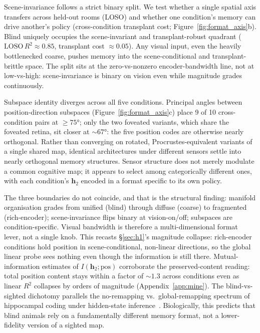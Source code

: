 \documentclass{article}
\begin{document}
Scene-invariance follows a strict binary split. We test whether a single spatial axis transfers across held-out rooms (LOSO) and whether one condition's memory can drive another's policy (cross-condition transplant cost; Figure~\ref{fig:format_axis}b). Blind uniquely occupies the scene-invariant and transplant-robust quadrant ($\text{LOSO}\,R^2 \approx 0.85$, transplant cost $\approx 0.05$). Any visual input, even the heavily bottlenecked coarse, pushes memory into the scene-conditional and transplant-brittle space. The split sits at the zero-vs-nonzero encoder-bandwidth line, not at low-vs-high: scene-invariance is binary on vision even while magnitude grades continuously.

Subspace identity diverges across all five conditions. Principal angles between position-direction subspaces (Figure~\ref{fig:format_axis}c) place 9 of 10 cross-condition pairs at $\geq 75°$; only the two foveated variants, which share the foveated retina, sit closer at $\sim 67°$: the five position codes are otherwise nearly orthogonal. Rather than converging on rotated, Procrustes-equivalent variants of a single shared map, identical architectures under different sensors settle into nearly orthogonal memory structures. Sensor structure does not merely modulate a common cognitive map; it appears to select among categorically different ones, with each condition's $\mathbf{h}_2$ encoded in a format specific to its own policy.

The three boundaries do not coincide, and that is the structural finding: manifold organisation grades from unified (blind) through diffuse (coarse) to fragmented (rich-encoder); scene-invariance flips binary at vision-on/off; subspaces are condition-specific. Visual bandwidth is therefore a multi-dimensional format lever, not a single knob. This recasts §\ref{sec:h1}'s magnitude collapse: rich-encoder conditions hold position in scene-conditional, non-linear directions, so the global linear probe sees nothing even though the information is still there. Mutual-information estimates of $I(\mathbf{h}_2; \mathrm{pos})$ corroborate the preserved-content reading: total position content stays within a factor of ${\sim}1.3$ across conditions even as linear $R^2$ collapses by orders of magnitude (Appendix~\ref{app:mine}). The blind-vs-sighted dichotomy parallels the no-remapping vs.\ global-remapping spectrum of hippocampal coding under hidden-state inference~\citep{sanders2020remapping}. Biologically, this predicts that blind animals rely on a fundamentally different memory format, not a lower-fidelity version of a sighted map.
\end{document}
